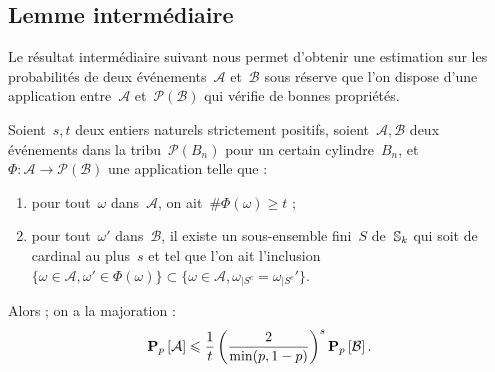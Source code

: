 	\subsection{Lemme intermédiaire}
		Le résultat intermédiaire suivant nous permet d'obtenir une estimation sur les probabilités de deux événements~$\mathcal{A}$ et~$\mathcal{B}$ sous réserve que l'on dispose d'une application entre~$\mathcal{A}$ et~$\mathcal{P}(\mathcal{B})$ qui vérifie de bonnes propriétés.
		\begin{lem}\label{lem:interGluant}
			Soient~$s,t$ deux entiers naturels strictement positifs, soient~$\mathcal{A},\mathcal{B}$ deux événements dans la tribu~$\mathcal{P}(B_n)$ pour un certain cylindre~$B_n$, et~$\Phi : \mathcal{A} \rightarrow \mathcal{P}(\mathcal{B})$ une application telle que :
			\begin{enumerate}
				\item pour tout~$\omega$ dans~$\mathcal{A}$, on ait~$\#\Phi(\omega)\geq t$ ; \label{item:interGluant:a}
				\item pour tout~$\omega'$ dans~$\mathcal{B}$, il existe un sous-ensemble fini~$S$ de~$\mathbb{S}_k$ qui soit de cardinal au plus~$s$ et tel que l'on ait l'inclusion~$\{\omega\in\mathcal{A},\omega'\in\Phi(\omega)\} \subset \{\omega\in\mathcal{A},\omega_{|S^c}=\omega_{|S^c}'\}$. \label{item:interGluant:b}
			\end{enumerate}
			Alors ; on a la majoration :
			\[
				\bm{\mathrm{P}}_{p}\left[\mathcal{A}\right] \leqslant \frac{1}{t}
					\left(\frac{2}{\min(p,1-p)}\right)^s
					\bm{\mathrm{P}}_{p}\left[\mathcal{B}\right].
			\]
		\end{lem}
